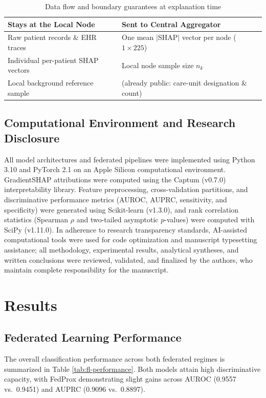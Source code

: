 \documentclass[runningheads]{llncs}
\begin{document}
\begin{table}[t]
\caption{Data flow and boundary guarantees at explanation time}
\label{tab:privacy}
\centering
\begin{tabular}{ll}
\hline
\textbf{Stays at the Local Node} & \textbf{Sent to Central Aggregator} \\
\hline
Raw patient records \& EHR traces & One mean $|$SHAP$|$ vector per node ($1\times225$) \\
Individual per-patient SHAP vectors & Local node sample size $n_k$ \\
Local background reference sample & (already public: care-unit designation \& count) \\
\hline
\end{tabular}
\end{table}

\subsection{Computational Environment and Research Disclosure}
All model architectures and federated pipelines were implemented using Python 3.10 and PyTorch 2.1 on an Apple Silicon computational environment. GradientSHAP attributions were computed using the Captum (v0.7.0) interpretability library. Feature preprocessing, cross-validation partitions, and discriminative performance metrics (AUROC, AUPRC, sensitivity, and specificity) were generated using Scikit-learn (v1.3.0), and rank correlation statistics (Spearman $\rho$ and two-tailed asymptotic $p$-values) were computed with SciPy (v1.11.0). In adherence to research transparency standards, AI-assisted computational tools were used for code optimization and manuscript typesetting assistance; all methodology, experimental results, analytical syntheses, and written conclusions were reviewed, validated, and finalized by the authors, who maintain complete responsibility for the manuscript.

\section{Results}\label{sec:results}

\subsection{Federated Learning Performance}
The overall classification performance across both federated regimes is summarized in Table \ref{tab:fl-performance}. Both models attain high discriminative capacity, with FedProx demonstrating slight gains across AUROC (0.9557 vs.\ 0.9451) and AUPRC (0.9096 vs.\ 0.8897).
\end{document}
